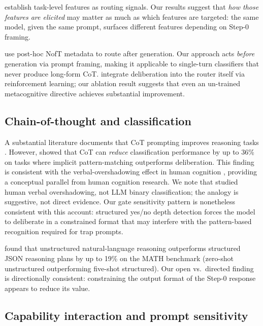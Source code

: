 \documentclass[11pt,a4paper]{article}
\begin{document}
\citet{Agrawal2025} establish task-level features as routing signals.
Our results suggest that \emph{how those features are elicited} may matter
as much as which features are targeted: the same model, given the same
prompt, surfaces different features depending on Step-0 framing.

\citet{MarinelliPichlmeier2025} use post-hoc NofT metadata to route after
generation.  Our approach acts \emph{before} generation via prompt framing,
making it applicable to single-turn classifiers that never produce
long-form CoT.  \citet{ZhangRouterR12025} integrate deliberation into the
router itself via reinforcement learning; our ablation result suggests
that even an un-trained metacognitive directive achieves substantial
improvement.

\subsection{Chain-of-thought and classification}

A substantial literature documents that CoT prompting improves reasoning
tasks \citep{Wei2022,Kojima2022}.  However, \citet{Liu2024ICML} showed that
CoT can \emph{reduce} classification performance by up to 36\% on tasks
where implicit pattern-matching outperforms deliberation.  This finding is
consistent with the verbal-overshadowing effect in human cognition
\citep{Liu2024ICML}, providing a conceptual parallel from human cognition
research.  We note that \citet{Liu2024ICML} studied human verbal
overshadowing, not LLM binary classification; the analogy is suggestive,
not direct evidence.  Our gate sensitivity pattern is nonetheless consistent
with this account: structured yes/no depth detection forces the model to
deliberate in a constrained format that may interfere with the pattern-based
recognition required for trap prompts.

\citet{GunasekaraRatnayake2025} found that unstructured natural-language
reasoning outperforms structured JSON reasoning plans by up to 19\%
on the MATH benchmark (zero-shot unstructured outperforming five-shot
structured).  Our open vs.\ directed finding is directionally consistent:
constraining the output format of the Step-0 response appears to reduce
its value.

\subsection{Capability interaction and prompt sensitivity}
\end{document}
